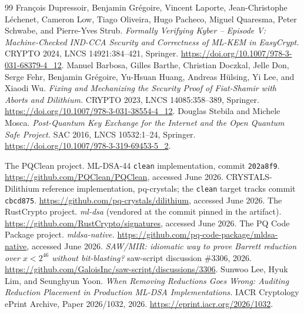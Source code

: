 \documentclass[journal=tches,submission,review]{iacrtrans}
\newcommand{\code}[1]{\texttt{#1}}
\newif\ifsubmissionanon \submissionanontrue
\begin{document}
\begin{thebibliography}{99}
  Fran\c{c}ois Dupressoir, Benjamin Gr\'egoire, Vincent Laporte, Jean-Christophe L\'echenet, Cameron
  Low, Tiago Oliveira, Hugo Pacheco, Miguel Quaresma, Peter Schwabe, and Pierre-Yves Strub.
  \emph{Formally Verifying Kyber -- Episode V: Machine-Checked IND-CCA Security and Correctness of
  ML-KEM in EasyCrypt.} CRYPTO 2024, LNCS 14921:384--421, Springer.
  \url{https://doi.org/10.1007/978-3-031-68379-4_12}.
 Manuel Barbosa, Gilles Barthe, Christian Doczkal, Jelle Don, Serge Fehr,
  Benjamin Gr\'egoire, Yu-Hsuan Huang, Andreas H\"ulsing, Yi Lee, and Xiaodi Wu. \emph{Fixing and
  Mechanizing the Security Proof of Fiat-Shamir with Aborts and Dilithium.} CRYPTO 2023,
  LNCS 14085:358--389, Springer. \url{https://doi.org/10.1007/978-3-031-38554-4_12}.
 Douglas Stebila and Michele Mosca. \emph{Post-Quantum Key Exchange for the Internet
  and the Open Quantum Safe Project.} SAC 2016, LNCS 10532:1--24, Springer.
  \url{https://doi.org/10.1007/978-3-319-69453-5_2}.

 The PQClean project. ML-DSA-44 \code{clean} implementation, commit
  \texttt{202a8f9}. \url{https://github.com/PQClean/PQClean}, accessed June 2026.
 CRYSTALS-Dilithium reference implementation, pq-crystals; the \code{clean} target
  tracks commit \texttt{cbcd875}. \url{https://github.com/pq-crystals/dilithium}, accessed June 2026.
 The RustCrypto project. \emph{ml-dsa} (vendored at the commit pinned in the
  artifact). \url{https://github.com/RustCrypto/signatures}, accessed June 2026.
 The PQ Code Package project. \emph{mldsa-native.}
  \url{https://github.com/pq-code-package/mldsa-native}, accessed June 2026.
 \ifsubmissionanon \emph{SAW/MIR: idiomatic way to prove Barrett reduction over
  $x < 2^{46}$ without bit-blasting?} saw-script discussion \#3306, 2026.\else R.\ Scott (Galois, Inc.)
  and A.\ Akshat. \emph{SAW/MIR: idiomatic way to prove Barrett reduction over $x < 2^{46}$ without
  bit-blasting?} saw-script discussion \#3306, 2026.\fi
  \url{https://github.com/GaloisInc/saw-script/discussions/3306}.
 Sunwoo Lee, Hyuk Lim, and Seunghyun Yoon.
  \emph{When Removing Reductions Goes Wrong: Auditing Reduction Placement in Production ML-DSA
  Implementations.} IACR Cryptology ePrint Archive, Paper 2026/1032, 2026.
  \url{https://eprint.iacr.org/2026/1032}.
\end{thebibliography}
\end{document}
